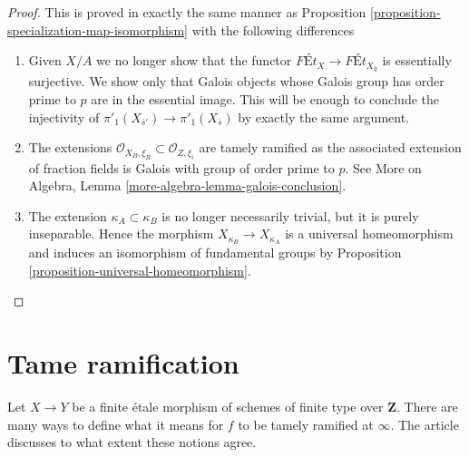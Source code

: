 \begin{proof}
This is proved in exactly the same manner as
Proposition \ref{proposition-specialization-map-isomorphism}
with the following differences
\begin{enumerate}
\item Given $X/A$ we no longer show that the functor
$\textit{F\'Et}_X \to \textit{F\'Et}_{X_{\overline{\eta}}}$
is essentially surjective. We show only that Galois objects
whose Galois group has order prime to $p$ are in the essential
image. This will be enough to conclude the injectivity of
$\pi'_1(X_{\overline{s}'}) \to \pi'_1(X_{\overline{s}})$ by
exactly the same argument.
\item The extensions
$\mathcal{O}_{X_B, \xi_B} \subset \mathcal{O}_{Z, \xi_i}$
are tamely ramified as the associated extension of fraction
fields is Galois with group of order prime to $p$. See
More on Algebra, Lemma \ref{more-algebra-lemma-galois-conclusion}.
\item The extension $\kappa_A \subset \kappa_B$ is no longer
necessarily trivial, but it is purely inseparable.
Hence the morphism $X_{\kappa_B} \to X_{\kappa_A}$
is a universal homeomorphism and induces an isomorphism
of fundamental groups by Proposition \ref{proposition-universal-homeomorphism}.
\end{enumerate}
\end{proof}













\section{Tame ramification}
\label{section-tame}

\noindent
Let $X \to Y$ be a finite \'etale morphism of schemes of finite type
over $\mathbf{Z}$. There are many ways to define what it means for $f$
to be tamely ramified at $\infty$. The article \cite{Kerz-Schmidt}
discusses to what extent these notions agree.


